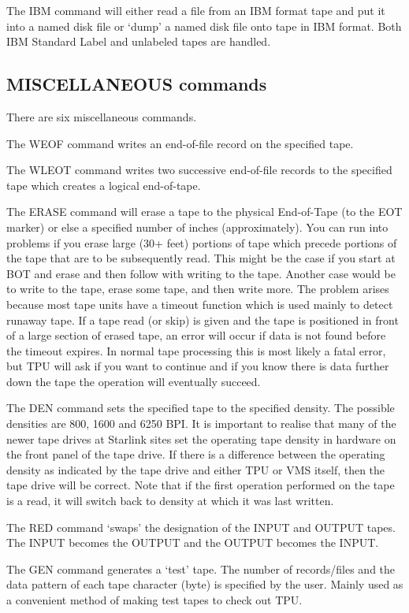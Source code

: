 The IBM command will either read a file from an IBM format tape and put it into
a named disk file or `dump' a named disk file onto tape in IBM format.
Both IBM Standard Label and unlabeled tapes are handled.

\subsection{MISCELLANEOUS commands}

There are six miscellaneous commands.

The WEOF command writes an end-of-file record on the specified tape.

The WLEOT command writes two successive end-of-file records to the specified
tape which creates a logical end-of-tape.

The ERASE command will erase a tape to the physical End-of-Tape (to the EOT
marker) or else a specified number of inches (approximately).
You can run into problems if you erase large (30+ feet) portions of tape which
precede portions of the tape that are to be subsequently read.
This might be the case if you start at BOT and erase and then follow with
writing to the tape.
Another case would be to write to the tape, erase some tape, and then write
more.
The problem arises because most tape units have a timeout function which is used
mainly to detect runaway tape.
If a tape read (or skip) is given and the tape is positioned in front of a large
section of erased tape, an error will occur if data is not found before the
timeout expires.
In normal tape processing this is most likely a fatal error, but TPU will ask if
you want to continue and if you know there is data further down the tape the
operation will eventually succeed.

The DEN command sets the specified tape to the specified density.
The possible densities are 800, 1600 and 6250 BPI.
It is important to realise that many of the newer tape drives at
Starlink sites set the operating tape density in hardware on the
front panel of the tape drive. If there is a difference between the
operating density as indicated by the tape drive and either
TPU or VMS itself, then the tape drive will be correct.
Note that if the first operation performed on the tape is a read, it will
switch back to density at which it was last written. 

The RED command `swaps' the designation of the INPUT and OUTPUT tapes.
The INPUT becomes the OUTPUT and the OUTPUT becomes the INPUT.

The GEN command generates a `test' tape.
The number of records/files and the data pattern of each tape character (byte)
is specified by the user.
Mainly used as a convenient method of making test tapes to check out TPU.

